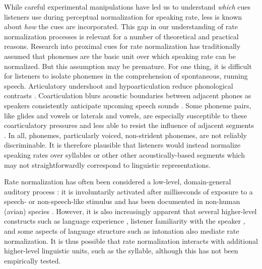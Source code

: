 While careful experimental manipulations have led us to understand \textit{which} cues listeners use during perceptual normalization for speaking rate, less is known about \textit{how} the cues are incorporated. This gap in our understanding of rate normalization processes is relevant for a number of theoretical and practical reasons. Research into proximal cues for rate normalization has traditionally assumed that phonemes are the basic unit over which speaking rate can be normalized. But this assumption may be premature. For one thing, it is difficult for listeners to isolate phonemes in the comprehension of spontaneous, running speech. Articulatory undershoot and hypoarticulation reduce phonological contrasts \citep{johnsonHyperspaceEffectPhonetic1993,lindblomExplainingPhoneticVariation1990}. Coarticulation blurs acoustic boundaries between adjacent phones as speakers consistently anticipate upcoming speech sounds \citep{whalenCoarticulationLargelyPlanned1990}. Some phoneme pairs, like glides and vowels or laterals and vowels, are especially susceptible to these coarticulatory pressures and less able to resist the influence of adjacent segments \citep{recasensCoarticulatoryPatternsDegrees1985}. In all, phonemes, particularly voiced, non-strident phonemes, are not reliably discriminable. It is therefore plausible that listeners would instead normalize speaking rates over syllables or other other acoustically-based segments which may not straightforwardly correspond to linguistic representations.

Rate normalization has often been considered a low-level, domain-general auditory process \citep{boskerAccountingRatedependentCategory2017}: it is involuntarily activated after milliseconds of exposure to a speech- or non-speech-like stimulus \citep{reinischSpeakerspecificProcessingLocal2016} and has been documented in non-human (avian) species \citep{welchEffectsSyllablefinalSegment2009}. However, it is also increasingly apparent that several higher-level constructs such as language experience \citep{baese-berkNonnativeSpeakersUse2016}, listener familiarity with the speaker \citep{kleinschmidtPerceptionVariableStructured2016,reinischSpeakerspecificProcessingLocal2016}, and some aspects of language structure such as intonation \citep{steffmanIntonationalStructureMediates2019} also mediate rate normalization. It is thus possible that rate normalization interacts with additional higher-level linguistic units, such as the syllable, although this has not been empirically tested. 

